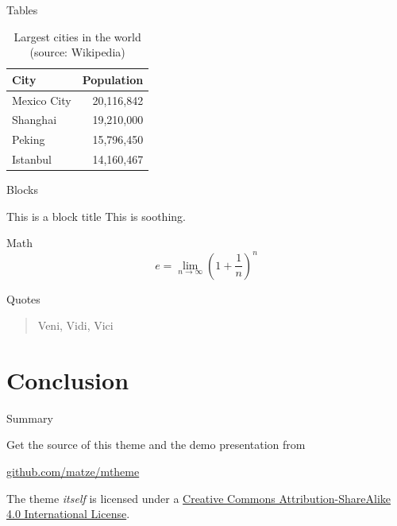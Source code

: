 \documentclass[10pt, compress]{beamer}
\begin{document}
\begin{frame}{Tables}
  \begin{table}
    \caption{Largest cities in the world (source: Wikipedia)}
    \begin{tabular}{lr}
      \toprule
      City & Population\\
      \midrule
      Mexico City & 20,116,842\\
      Shanghai & 19,210,000\\
      Peking & 15,796,450\\
      Istanbul & 14,160,467\\
      \bottomrule
    \end{tabular}
  \end{table}
\end{frame}
\begin{frame}{Blocks}

  \begin{block}{This is a block title}
    This is soothing.
  \end{block}

\end{frame}
\begin{frame}{Math}
  \begin{equation*}
    e = \lim_{n\to \infty} \left(1 + \frac{1}{n}\right)^n
  \end{equation*}
\end{frame}
\begin{frame}{Quotes}
  \begin{quote}
    Veni, Vidi, Vici
  \end{quote}
\end{frame}


\section{Conclusion}

\begin{frame}{Summary}

  Get the source of this theme and the demo presentation from

  \begin{center}\url{github.com/matze/mtheme}\end{center}

  The theme \emph{itself} is licensed under a
  \href{http://creativecommons.org/licenses/by-sa/4.0/}{Creative Commons
  Attribution-ShareAlike 4.0 International License}.

  \begin{center}\ccbysa\end{center}

\end{frame}

\end{document}
